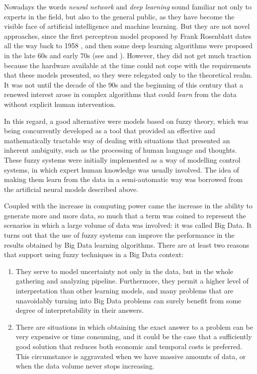 %
%
%

Nowadays the words \textit{neural network} and \textit{deep learning} sound familiar not only to experts in the field, but also to the general public, as they have become the visible face of artificial intelligence and machine learning. But they are not novel approaches, since the first perceptron model proposed by Frank Rosenblatt dates all the way back to 1958 \cite{rosenblatt1958perceptron}, and then some deep learning algorithms were proposed in the late 60s and early 70s (see \cite{ivakhnenko1967cybernetics} and \cite{ivakhnenko1971polynomial}). However, they did not get much traction because the hardware available at the time could not cope with the requirements that these models presented, so they were relegated only to the theoretical realm. It was not until the decade of the 90s and the beginning of this century that a renewed interest arose in complex algorithms that could \textit{learn} from the data without explicit human intervention.

In this regard, a good alternative were models based on fuzzy theory, which was being concurrently developed as a tool that provided an effective and mathematically tractable way of dealing with situations that presented an inherent ambiguity, such as the processing of human language and thoughts. These fuzzy systems were initially implemented as a way of modelling control systems, in which expert human knowledge was usually involved. The idea of making them learn from the data in a semi-automatic way was borrowed from the artificial neural models described above.

Coupled with the increase in computing power came the increase in the ability to generate more and more data, so much that a term was coined to represent the scenarios in which a large volume of data was involved: it was called Big Data. It turns out that the use of fuzzy systems can improve the performance in the results obtained by Big Data learning algorithms. There are at least two reasons that support using fuzzy techniques in a Big Data context:

\begin{enumerate}[1.]
  \item They serve to model uncertainty not only in the data, but in the whole gathering and analyzing pipeline. Furthermore, they permit a higher level of interpretation than other learning models, and many problems that are unavoidably turning into Big Data problems can surely benefit from some degree of interpretability in their answers.
  \item There are situations in which obtaining the exact answer to a problem can be very expensive or time consuming, and it could be the case that a sufficiently good solution that reduces both economic and temporal costs is preferred. This circumstance is aggravated when we have massive amounts of data, or when the data volume never stops increasing.
\end{enumerate}

